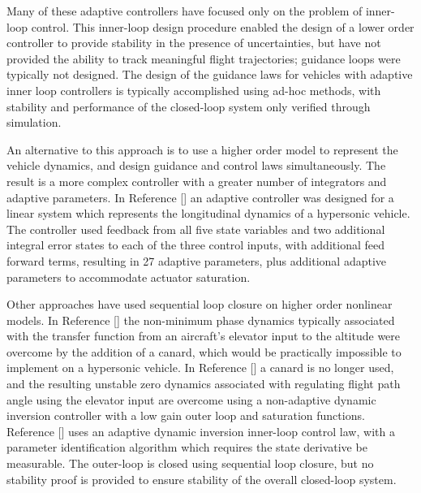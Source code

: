 \documentclass[]{../sty/aiaa-tc}
\theoremstyle{examplestyle}
\begin{document}
  Many of these adaptive controllers have focused only on the problem of inner-loop control.\cite{mcfarland.autopilot.1996,wise.munition.2005,wise.autopilot.2008,qu.gnc.2013,wiese.adaptive.2013,wiese.gnc.2015,wiese.jgcd.2015}
  This inner-loop design procedure enabled the design of a lower order controller to provide stability in the presence of uncertainties, but have not provided the ability to track meaningful flight trajectories; guidance loops were typically not designed.
  The design of the guidance laws for vehicles with adaptive inner loop controllers is typically accomplished using ad-hoc methods, with stability and performance of the closed-loop system only verified through simulation.

  An alternative to this approach is to use a higher order model to represent the vehicle dynamics, and design guidance and control laws simultaneously.
  The result is a more complex controller with a greater number of integrators and adaptive parameters.
  In Reference [] an adaptive controller was designed for a linear system which represents the longitudinal dynamics of a hypersonic vehicle.
  The controller used feedback from all five state variables and two additional integral error states to each of the three control inputs, with additional feed forward terms, resulting in 27 adaptive parameters, plus additional adaptive parameters to accommodate actuator saturation.

  Other approaches have used sequential loop closure on higher order nonlinear models.
  In Reference [] the non-minimum phase dynamics typically associated with the transfer function from an aircraft's elevator input to the altitude were overcome by the addition of a canard, which would be practically impossible to implement on a hypersonic vehicle.
  In Reference [] a canard is no longer used, and the resulting unstable zero dynamics associated with regulating flight path angle using the elevator input are overcome using a non-adaptive dynamic inversion controller with a low gain outer loop and saturation functions.
  Reference [] uses an adaptive dynamic inversion inner-loop control law, with a parameter identification algorithm which requires the state derivative be measurable.
  The outer-loop is closed using sequential loop closure, but no stability proof is provided to ensure stability of the overall closed-loop system.
\end{document}
